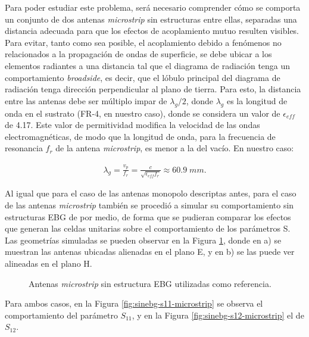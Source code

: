 Para poder estudiar este problema, será necesario comprender cómo se comporta un conjunto de dos antenas \textit{microstrip} sin estructuras entre ellas, separadas una distancia adecuada para que los efectos de acoplamiento mutuo resulten visibles. Para evitar, tanto como sea posible, el acoplamiento debido a fenómenos no relacionados a la propagación de ondas de superficie, se debe ubicar a los elementos radiantes a una distancia tal que el diagrama de radiación tenga un comportamiento \textit{broadside}, es decir, que el lóbulo principal del diagrama de radiación tenga dirección perpendicular al plano de tierra. Para esto, la distancia entre las antenas debe ser múltiplo impar de $\lambda_g/2$, donde $\lambda_g$ es la longitud de onda en el sustrato (FR-4, en nuestro caso), donde se considera un valor de $\epsilon_{eff}$ de 4.17. Este valor de permitividad modifica la velocidad de las ondas electromagnéticas, de modo que la longitud de onda, para la frecuencia de resonancia $f_r$ de la antena \textit{microstrip}, es menor a la del vacío. En nuestro caso:

\begin{align}
	\label{eq:lambdag}
	\lambda_g = \frac{v_p}{f_r} = \frac{c}{\sqrt{\epsilon_{eff} f_r}} \approx 60.9\; mm.
\end{align}


Al igual que para el caso de las antenas monopolo descriptas antes, para el caso de las antenas \textit{microstrip} también se procedió a simular su comportamiento sin estructuras EBG de por medio, de forma que se pudieran comparar los efectos que generan las celdas unitarias sobre el comportamiento de los parámetros S. Las geometrías simuladas se pueden observar en la Figura \ref{fig:geometrias-sinebg-microstrip-EyH}, donde en a) se muestran las antenas ubicadas alienadas en el plano E, y en b) se las puede ver alineadas en el plano H.

\begin{figure}[H]
	\centering 
	\caption{Antenas \textit{microstrip} sin estructura EBG utilizadas como referencia.}
	\label{fig:geometrias-sinebg-microstrip-EyH}
\end{figure}

Para ambos casos, en la Figura \ref{fig:sinebg-s11-microstrip} se observa el comportamiento del parámetro $S_{11}$, y en la Figura \ref{fig:sinebg-s12-microstrip} el de $S_{12}$.


